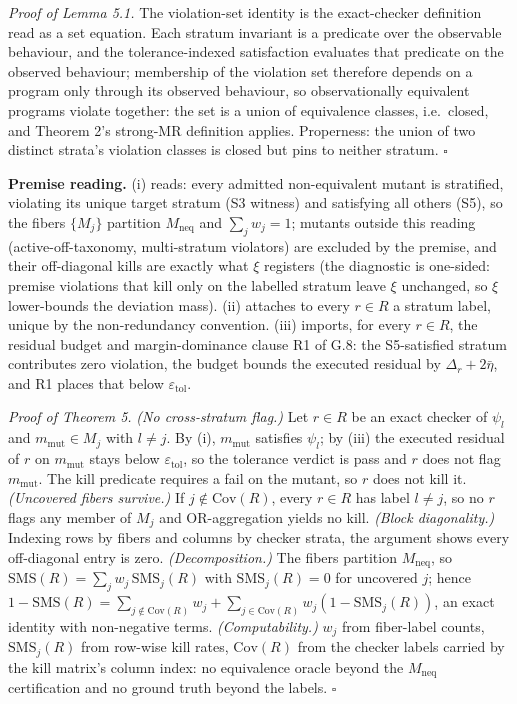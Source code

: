 \documentclass[manuscript,screen,review]{acmart}
\begin{document}
\emph{Proof of Lemma 5.1.} The violation-set identity is the exact-checker
definition read as a set equation. Each stratum invariant is a predicate
over the observable behaviour, and the tolerance-indexed satisfaction
evaluates that predicate on the observed behaviour; membership of the
violation set therefore depends on a program only through its observed
behaviour, so observationally equivalent programs violate together: the
set is a union of equivalence classes, i.e.\ closed, and Theorem 2's
strong-MR definition applies. Properness: the union of two distinct
strata's violation classes is closed but pins to neither stratum.
$\square$

\textbf{Premise reading.} (i) reads: every admitted non-equivalent
mutant is stratified, violating its unique target stratum (S3 witness)
and satisfying all others (S5), so the fibers $\{M_j\}$ partition
$M_{\mathrm{neq}}$ and $\sum_j w_j=1$; mutants outside this reading
(active-off-taxonomy, multi-stratum violators) are excluded by the
premise, and their off-diagonal kills are exactly what $\xi$ registers
(the diagnostic is one-sided: premise violations that kill only on the
labelled stratum leave $\xi$ unchanged, so $\xi$ lower-bounds the
deviation mass). (ii)
attaches to every $r\in R$ a stratum label, unique by the non-redundancy
convention. (iii) imports, for every $r\in R$, the residual budget and
margin-dominance clause R1 of G.8: the S5-satisfied stratum contributes
zero violation, the budget bounds the executed residual by
$\Delta_r+2\bar\eta$, and R1 places that below
$\varepsilon_{\mathrm{tol}}$.

\emph{Proof of Theorem 5.} \emph{(No cross-stratum flag.)} Let $r\in R$
be an exact checker of $\psi_l$ and $m_{\mathrm{mut}}\in M_j$ with
$l\ne j$. By (i), $m_{\mathrm{mut}}$ satisfies $\psi_l$; by (iii) the
executed residual of $r$ on $m_{\mathrm{mut}}$ stays below
$\varepsilon_{\mathrm{tol}}$, so the tolerance verdict is pass and $r$
does not flag $m_{\mathrm{mut}}$. The kill predicate requires a fail on
the mutant, so $r$ does not kill it. \emph{(Uncovered fibers survive.)}
If $j\notin\mathrm{Cov}(R)$, every $r\in R$ has label $l\ne j$, so no
$r$ flags any member of $M_j$ and OR-aggregation yields no kill.
\emph{(Block diagonality.)} Indexing rows by fibers and columns by
checker strata, the argument shows every off-diagonal entry is zero.
\emph{(Decomposition.)} The fibers partition $M_{\mathrm{neq}}$, so
$\mathrm{SMS}(R)=\sum_j w_j\,\mathrm{SMS}_j(R)$ with
$\mathrm{SMS}_j(R)=0$ for uncovered $j$; hence
$1-\mathrm{SMS}(R)=\sum_{j\notin\mathrm{Cov}(R)}w_j+\sum_{j\in\mathrm{Cov}(R)}w_j(1-\mathrm{SMS}_j(R))$,
an exact identity with non-negative terms. \emph{(Computability.)}
$w_j$ from fiber-label counts, $\mathrm{SMS}_j(R)$ from row-wise kill
rates, $\mathrm{Cov}(R)$ from the checker labels carried by the kill
matrix's column index: no equivalence oracle beyond the
$M_{\mathrm{neq}}$ certification and no ground truth beyond the labels.
$\square$
\end{document}
